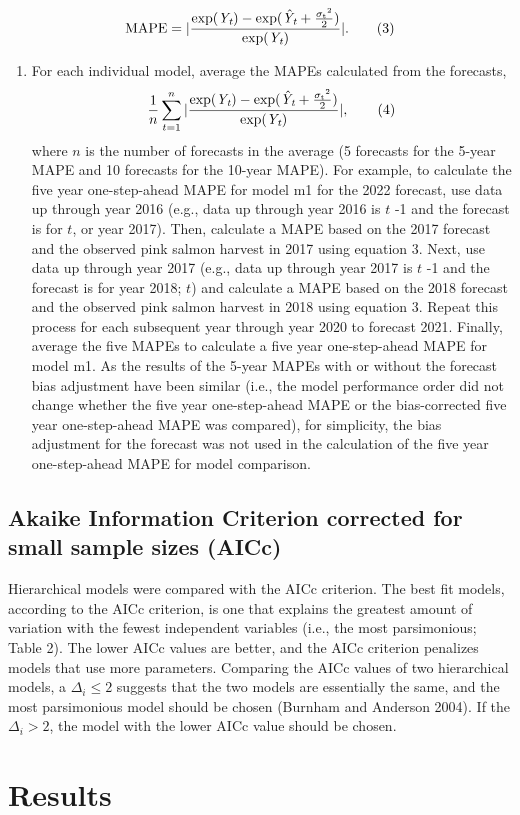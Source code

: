 \documentclass[
  letterpaper,
  DIV=11,
  numbers=noendperiod]{scrartcl}
\providecommand{\tightlist}{%
  \setlength{\itemsep}{0pt}\setlength{\parskip}{0pt}}
\begin{document}
\[\text{MAPE} = |\frac{\rm exp{(\textit Y_{\textit t})} -\rm exp (\hat{\textit Y_{\textit t}} + \frac{{\sigma_t}^2}{2})}{\rm exp (\textit Y_{\textit t})}|.\tag{3}\]

\begin{enumerate}
\def\labelenumi{\arabic{enumi}.}
\setcounter{enumi}{3}
\tightlist
\item
  For each individual model, average the MAPEs calculated from the
  forecasts,
  \[\frac{1}{n} \sum_{t=1}^{n} |\frac{\rm exp{(\textit Y_{\textit t})} -\rm exp (\hat{\textit Y_{\textit t}} + \frac{{\sigma_t}^2}{2})}{\rm exp (\textit Y_{\textit t})}|,\tag{4}\]
  where \(n\) is the number of forecasts in the average (5 forecasts for
  the 5-year MAPE and 10 forecasts for the 10-year MAPE). For example,
  to calculate the five year one-step-ahead MAPE for model m1 for the
  2022 forecast, use data up through year 2016 (e.g., data up through
  year 2016 is \(t\) -1 and the forecast is for \(t\), or year 2017).
  Then, calculate a MAPE based on the 2017 forecast and the observed
  pink salmon harvest in 2017 using equation 3. Next, use data up
  through year 2017 (e.g., data up through year 2017 is \(t\) -1 and the
  forecast is for year 2018; \(t\)) and calculate a MAPE based on the
  2018 forecast and the observed pink salmon harvest in 2018 using
  equation 3. Repeat this process for each subsequent year through year
  2020 to forecast 2021. Finally, average the five MAPEs to calculate a
  five year one-step-ahead MAPE for model m1. As the results of the
  5-year MAPEs with or without the forecast bias adjustment have been
  similar (i.e., the model performance order did not change whether the
  five year one-step-ahead MAPE or the bias-corrected five year
  one-step-ahead MAPE was compared), for simplicity, the bias adjustment
  for the forecast was not used in the calculation of the five year
  one-step-ahead MAPE for model comparison.
\end{enumerate}

\subsection{Akaike Information Criterion corrected for small sample
sizes
(AICc)}\label{akaike-information-criterion-corrected-for-small-sample-sizes-aicc}

Hierarchical models were compared with the AICc criterion. The best fit
models, according to the AICc criterion, is one that explains the
greatest amount of variation with the fewest independent variables
(i.e., the most parsimonious; Table 2). The lower AICc values are
better, and the AICc criterion penalizes models that use more
parameters. Comparing the AICc values of two hierarchical models, a
\(\Delta_i \leq 2\) suggests that the two models are essentially the
same, and the most parsimonious model should be chosen (Burnham and
Anderson 2004). If the \(\Delta_i > 2\), the model with the lower AICc
value should be chosen.

\section{Results}\label{results}
\end{document}

